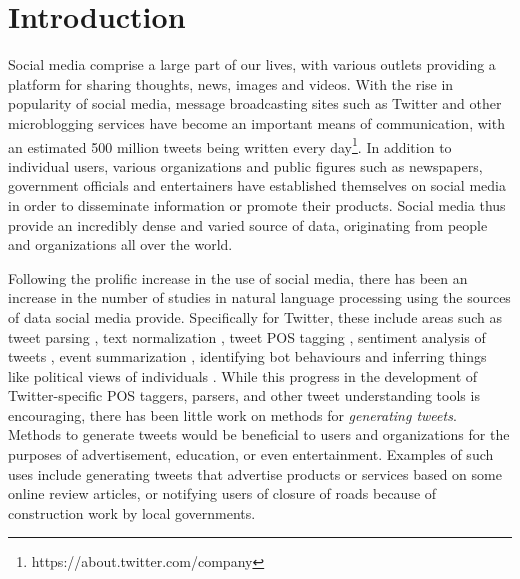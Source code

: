 \chapter{Introduction}
\label{chap:intro}

Social media comprise a large part of our lives, with various outlets providing a platform for sharing thoughts, news, images and videos. With the rise in popularity of social media, message broadcasting sites such as Twitter and other microblogging services have become an important means of communication, with an estimated 500 million tweets being written every day\footnote{https://about.twitter.com/company}. In addition to individual users, various organizations and public figures such as newspapers, government officials and entertainers have established themselves on social media in order to disseminate information or promote their products. Social media thus provide an incredibly dense and varied source of data, originating from people and organizations all over the world.

Following the prolific increase in the use of social media, there has been an increase in the number of studies in natural language processing using the sources of data social media provide. Specifically for Twitter, these include areas such as tweet parsing \citep{ritter2011named, kong-etal-2014}, text normalization \citep{han2011lexical, kaufmann2010syntactic}, tweet POS tagging \citep{gimpel2011part, owoputi-etal-2013}, sentiment analysis of tweets \citep{kouloumpis2011twitter, mohammad2013nrc}, event summarization \citep{chakrabarti2011event, nichols2012summarizing}, identifying bot behaviours \citep{chu2012detecting} and inferring things like political views of individuals \citep{mohammad2013identifying}. While this progress in the development of Twitter-specific POS taggers, parsers, and other tweet understanding tools is encouraging, there has been little work on methods for \textit{generating tweets}. Methods to generate tweets would be beneficial to users and organizations for the purposes of advertisement, education, or even entertainment. Examples of such uses include generating tweets that advertise products or services based on some online review articles, or notifying users of closure of roads because of construction work by local governments.


